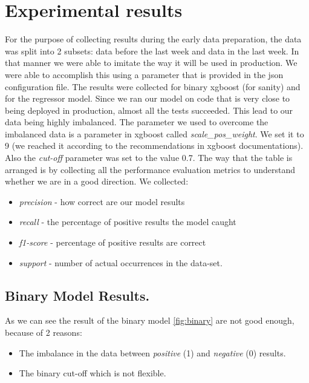 \documentclass{article}
\begin{document}
\section{Experimental results}
For the purpose of collecting results during the early data preparation, the data was split into 2 subsets: data before the last week and data in the last week. In that manner we were able to imitate the way it will be used in production. We were able to accomplish this using a parameter that is provided in the json configuration file.
The results were collected for binary xgboost (for sanity) and for the regressor model. Since we ran our model on code that is very close to being deployed in production, almost all the tests succeeded. This lead to our data being highly imbalanced.
The parameter we used to overcome the imbalanced data is a parameter in xgboost called \textit{scale\_pos\_weight}. We set it to 9 (we reached it according to the recommendations in xgboost documentations). Also the \textit{cut-off} parameter was set to the value 0.7. The way that the table is arranged is by collecting all the performance evaluation metrics to understand whether we are in a good direction.
We collected:
\begin{itemize}
\item \textit{precision} - how correct are our model results
\item \textit{recall} - the percentage of positive results the model caught
\item \textit{f1-score} - percentage of positive results are correct
\item \textit{support} - number of actual occurrences in the data-set.
\end{itemize}

\subsection{Binary Model Results.}
As we can see the result of the binary model \ref{fig:binary} are not good enough, because of 2 reasons:
\begin{itemize}
\item The imbalance in the data between \textit{positive} (1) and \textit{negative} (0) results.
\item The binary cut-off which is not flexible.
\end{itemize}
\end{document}
